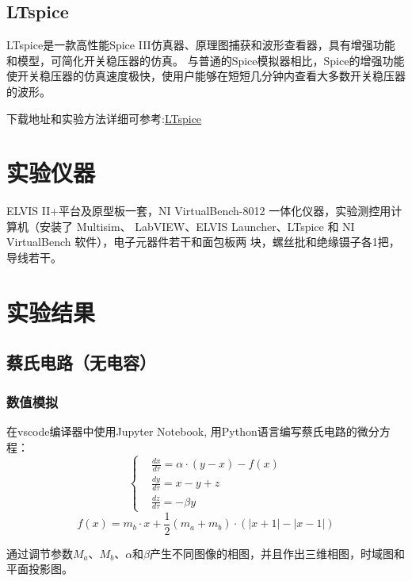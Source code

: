 \documentclass[10pt,a4paper,twoside,UTF8]{ctexart}
\begin{document}
\subsection{LTspice}
LTspice是一款高性能Spice III仿真器、原理图捕获和波形查看器，具有增强功能和模型，可简化开关稳压器的仿真。
与普通的Spice模拟器相比，Spice的增强功能使开关稳压器的仿真速度极快，使用户能够在短短几分钟内查看大多数开关稳压器的波形。

下载地址和实验方法详细可参考:\hyperlink{https://www.analog.com/cn/design-center/design-tools-and-calculators/ltspice-simulator.html}{LTspice}

\section{实验仪器}

ELVIS II+平台及原型板一套，NI VirtualBench-8012 一体化仪器，实验测控用计算机（安装了 Multisim、
LabVIEW、ELVIS Launcher、LTspice 和 NI VirtualBench 软件），电子元器件若干和面包板两
块，螺丝批和绝缘镊子各1把，导线若干。

\section{实验结果}
\subsection{蔡氏电路（无电容）}
\subsubsection{数值模拟}

在vscode编译器中使用Jupyter Notebook, 用Python语言编写蔡氏电路的微分方程：
\[\left\{
\begin{aligned}
&\frac{dx}{d\tau}=\alpha \cdot  (y-x)-f(x) \\
&\frac{dy}{d\tau}=x-y+z \\
&\frac{dz}{d\tau}=-\beta y
\end{aligned}
\right.
\]
\begin{equation*}
	f(x)=m_b \cdot x +\frac{1}{2}(m_a+m_b)\cdot (\left\lvert x+1 \right\rvert -\left\lvert x-1\right\rvert )
\end{equation*}

通过调节参数$M_a$、$M_b$、$\alpha$和$\beta$产生不同图像的相图，并且作出三维相图，时域图和平面投影图。
\end{document}

